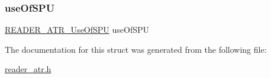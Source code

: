 \mbox{\label{struct_r_e_a_d_e_r___a_t_r___atr_a7d23fda1eb2b5cd25709f6152299f944}} 
\subsubsection{\texorpdfstring{use\+Of\+S\+PU}{useOfSPU}}
{\footnotesize\ttfamily \hyperlink{reader__atr_8h_abefacd0599f2700370b31a1fae95caaf}{R\+E\+A\+D\+E\+R\+\_\+\+A\+T\+R\+\_\+\+Use\+Of\+S\+PU} use\+Of\+S\+PU}



The documentation for this struct was generated from the following file\+:\begin{DoxyCompactItemize}
\item 
\hyperlink{reader__atr_8h}{reader\+\_\+atr.\+h}\end{DoxyCompactItemize}
